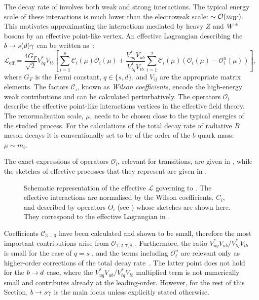 The decay rate of \BtoXsdgamma involves both weak and strong interactions.
The typical energy scale of these interactions is much lower than the electroweak scale: $\sim{\ensuremath{\cal O}}(m_W)$.
This motivates approximating the interactions mediated by heavy $Z$ and $W^\pm$ bosons by an effective point-like vertex.
An effective Lagrangian describing the $b\rightarrow s(d)\gamma$ can be written as~\cite{Kaminski:2012eb,Misiak:2015xwa}:
\begin{equation}\label{eq:effective_lagrangian}
    \mathcal{L}_{\mathrm{eff}} = \frac{4G_F}{\sqrt{2}}V_{tq}^*V_{tb}\left[\sum^{8}_{i=1}\mathcal{C}_i(\mu)\mathcal{O}_i(\mu)
                                                + \frac{V^*_{uq}V_{ub}}{V^*_{tq}V_{tb}}\sum^{2}_{i=1}\mathcal{C}_i(\mu)(\mathcal{O}_i(\mu)-\mathcal{O}_i^u(\mu))\right],
\end{equation}
where $G_F$ is the Fermi constant, $q\in\{s,d\}$, and $V_{ij}$ are the appropriate \CKM matrix elements.
The factors $\mathcal{C}_i$, known as \textit{Wilson coefficients}, encode the high-energy weak contributions and can be calculated perturbatively.
The operators $\mathcal{O}_i$ describe the effective point-like interactions vertices in the effective field theory.
The renormalisation scale, $\mu$, needs to be chosen close to the typical energies of the studied process.
For the calculations of the total decay rate of radiative $B$ meson decays it is conventionally set to be of the order of the $b$ quark mass: $\mu\sim m_b$.

The exact expressions of operators $\mathcal{O}_i$, relevant for \btosgamma transitions, are given in , while the sketches of effective processes that they represent are given in .
\begin{figure}[hbtp!]
    
\caption{\label{fig:b_to_s_gamma_effective}
Schematic representation of the \SM effective $\mathcal{L}$ governing to \BtoXsgamma. 
The effective interactions are normalised by the Wilson coefficients, $C_i$, and described by operators $O_i$ (see ) whose sketches are shown here.
They correspond to the effective Lagrangian in .
}
\end{figure}
Coefficients $\mathcal{C}_{3-6}$ have been calculated and shown to be small, therefore the most important contributions arise from $\mathcal{O}_{1,2,7,8}$ \cite{Chetyrkin:1996vx,Misiak:2020vlo}.
Furthermore, the ratio $V^*_{uq}V_{ub}/V^*_{tq}V_{tb}$ is small for the case of $q=s$ \cite{Charles:2015gya}, and the terms including $\mathcal{O}^u_i$ are relevant only as higher-order corrections of the total decay rate~\cite{Misiak:2015xwa}.
The latter point does not hold for the $b\rightarrow d$ case, where the $V^*_{uq}V_{ub}/V^*_{tq}V_{tb}$ multiplied term is not numerically small and contributes already at the leading-order.
However, for the rest of this Section, $b\rightarrow s\gamma$ is the main focus unless explicitly stated otherwise.

